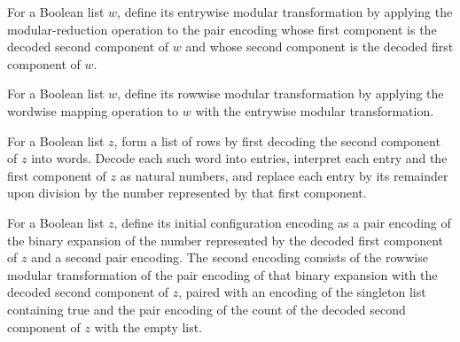 \begin{definition}
\label{Complexity.BinArith.entryModW}
\leanok
{}
For a Boolean list $w$, define its entrywise modular transformation by applying the
modular-reduction operation to the pair encoding whose first component is the decoded
second component of $w$ and whose second component is the decoded first component of
$w$.
\end{definition}

\begin{definition}
\label{Complexity.BinArith.rowModW}
\leanok
{}
For a Boolean list $w$, define its rowwise modular transformation by applying the
wordwise mapping operation to $w$ with the entrywise modular transformation.
\end{definition}

\begin{definition}
\label{Complexity.BinArith.initRows}
\leanok
{}
For a Boolean list $z$, form a list of rows by first decoding the second component of
$z$ into words. Decode each such word into entries, interpret each entry and the first
component of $z$ as natural numbers, and replace each entry by its remainder upon
division by the number represented by that first component.
\end{definition}

\begin{definition}
\label{Complexity.BinArith.initW}
\leanok
{}
For a Boolean list $z$, define its initial configuration encoding as a pair encoding of
the binary expansion of the number represented by the decoded first component of $z$ and
a second pair encoding. The second encoding consists of the rowwise modular
transformation of the pair encoding of that binary expansion with the decoded second
component of $z$, paired with an encoding of the singleton list containing true and the
pair encoding of the count of the decoded second component of $z$ with the empty list.
\end{definition}

